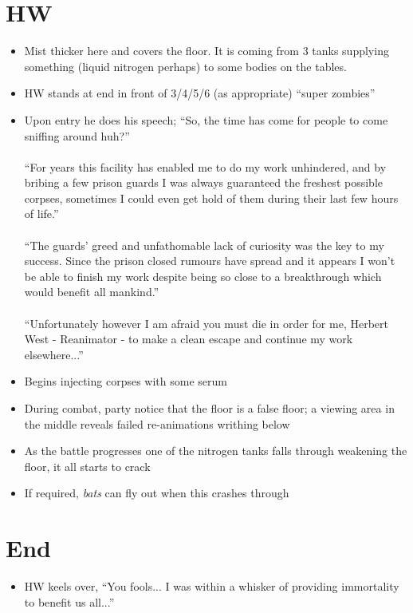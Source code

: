 \documentclass[12pt,a4paper]{article}
\begin{document}
\section*{HW}
\large
\begin{itemize}
\item{Mist thicker here and covers the floor.  It is coming from 3 tanks supplying something (liquid nitrogen perhaps) to some bodies on the tables.}
\item{HW stands at end in front of 3/4/5/6 (as appropriate) ``super zombies''}
\item{Upon entry he does his speech; ``So, the time has come for people to come sniffing around huh?''\\\\ ``For years this facility has enabled me to do my work unhindered, and by bribing a few prison guards I was always guaranteed the freshest possible corpses, sometimes I could even get hold of them during their last few hours of life.''\\\\  ``The guards' greed and unfathomable lack of curiosity was the key to my success.  Since the prison closed rumours have spread and it appears I won't be able to finish my work despite being so close to a breakthrough which would benefit all mankind.''\\\\  ``Unfortunately however I am afraid you must die in order for me, Herbert West - Reanimator - to make a clean escape and continue my work elsewhere...''}
\item{Begins injecting corpses with some serum}
\item{During combat, party notice that the floor is a false floor; a viewing area in the middle reveals failed re-animations writhing below}
\item{As the battle progresses one of the nitrogen tanks falls through weakening the floor, it all starts to crack}
\item{If required, \textit{bats} can fly out when this crashes through}
\end{itemize}
\normalsize
\section*{End}
\large
\begin{itemize}
\item{HW keels over, ``You fools... I was within a whisker of providing immortality to benefit us all...''}
\end{itemize}
\normalsize
\end{document}
